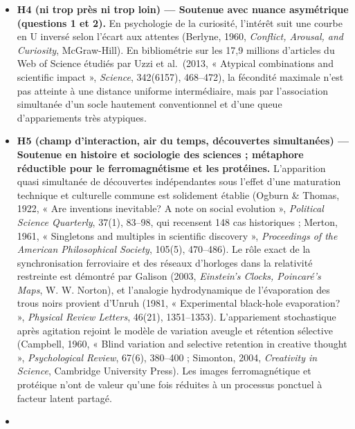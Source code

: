 \documentclass[a4paper,11pt]{article}
\begin{document}
\begin{itemize}
{  Sciences}, MIT Press). En revanche, l'invocation du théorème de
  Noether et d'un lagrangien est une métaphore non testable : Noether
  requiert l'action d'un groupe de Lie continu de symétries sur une
  intégrale d'action différentiable, structure absente d'un réseau
  discret de concepts.
\item
  \textbf{H4 (ni trop près ni trop loin) --- Soutenue avec nuance
  asymétrique (questions 1 et 2).} En psychologie de la curiosité,
  l'intérêt suit une courbe en U inversé selon l'écart aux attentes
  (Berlyne, 1960, \emph{Conflict, Arousal, and Curiosity}, McGraw-Hill).
  En bibliométrie sur les 17,9 millions d'articles du Web of Science
  étudiés par Uzzi et al.~(2013, « Atypical combinations and scientific
  impact », \emph{Science}, 342(6157), 468--472), la fécondité maximale
  n'est pas atteinte à une distance uniforme intermédiaire, mais par
  l'association simultanée d'un socle hautement conventionnel et d'une
  queue d'appariements très atypiques.
\item
  \textbf{H5 (champ d'interaction, air du temps, découvertes
  simultanées) --- Soutenue en histoire et sociologie des sciences ;
  métaphore réductible pour le ferromagnétisme et les protéines.}
  L'apparition quasi simultanée de découvertes indépendantes sous
  l'effet d'une maturation technique et culturelle commune est
  solidement établie (Ogburn \& Thomas, 1922, « Are inventions
  inevitable? A note on social evolution », \emph{Political Science
  Quarterly}, 37(1), 83--98, qui recensent 148 cas historiques ; Merton,
  1961, « Singletons and multiples in scientific discovery »,
  \emph{Proceedings of the American Philosophical Society}, 105(5),
  470--486). Le rôle exact de la synchronisation ferroviaire et des
  réseaux d'horloges dans la relativité restreinte est démontré par
  Galison (2003, \emph{Einstein's Clocks, Poincaré's Maps}, W. W.
  Norton), et l'analogie hydrodynamique de l'évaporation des trous noirs
  provient d'Unruh (1981, « Experimental black-hole evaporation? »,
  \emph{Physical Review Letters}, 46(21), 1351--1353). L'appariement
  stochastique après agitation rejoint le modèle de variation aveugle et
  rétention sélective (Campbell, 1960, « Blind variation and selective
  retention in creative thought », \emph{Psychological Review}, 67(6),
  380--400 ; Simonton, 2004, \emph{Creativity in Science}, Cambridge
  University Press). Les images ferromagnétique et protéique n'ont de
  valeur qu'une fois réduites à un processus ponctuel à facteur latent
  partagé.
\item

\end{itemize}
\end{document}
